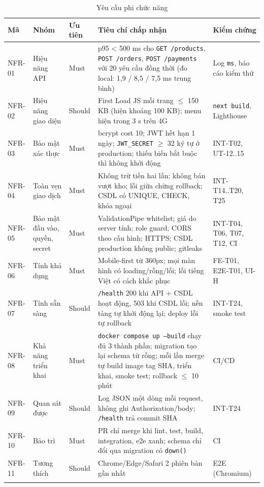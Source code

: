 \documentclass[a4paper]{article}
\newcommand{\st}[1]{\texttt{#1}}
\begin{document}
{\begin{longtable}{|L{1.3cm}|L{2.4cm}|L{1.15cm}|L{7.2cm}|L{2.4cm}|}
\hline
\textbf{Mã} & \textbf{Nhóm} & \textbf{Ưu tiên} & \textbf{Tiêu chí chấp nhận} & \textbf{Kiểm chứng} \\ \hline
\endhead
NFR-01 & Hiệu năng API & Must & p95 < 500 ms cho \st{GET /products}, \st{POST /orders}, \st{POST /payments} với 20 yêu cầu đồng thời (đo local: 1,9 / 8,5 / 7,5 ms trung bình) & Log \st{ms}, báo cáo kiểm thử \\ \hline
NFR-02 & Hiệu năng giao diện & Should & First Load JS mỗi trang $\le$ 150 KB (hiện khoảng 100 KB); menu hiện trong 3 s trên 4G & \st{next build}, Lighthouse \\ \hline
NFR-03 & Bảo mật xác thực & Must & bcrypt cost 10; JWT hết hạn 1 ngày; \st{JWT\_SECRET} $\ge$ 32 ký tự ở production; thiếu biến bắt buộc thì không khởi động & INT-T02, UT-12..15 \\ \hline
NFR-04 & Toàn vẹn giao dịch & Must & Không trừ tiền hai lần; không bán vượt kho; lỗi giữa chừng rollback; CSDL có UNIQUE, CHECK, khóa ngoại & INT-T14..T20, T25 \\ \hline
NFR-05 & Bảo mật đầu vào, quyền, secret & Must & ValidationPipe whitelist; giá do server tính; role guard; CORS theo cấu hình; HTTPS; CSDL production không public; gitleaks & INT-T04, T06, T07, T12, CI \\ \hline
NFR-06 & Tính khả dụng & Must & Mobile-first từ 360px; mọi màn hình có loading/rỗng/lỗi; lỗi tiếng Việt có cách khắc phục & FE-T01, E2E-T01, UI-H \\ \hline
NFR-07 & Tính sẵn sàng & Should & \st{/health} 200 khi API + CSDL hoạt động, 503 khi CSDL lỗi; nền tảng tự khởi động lại; deploy lỗi tự rollback & INT-T24, smoke test \\ \hline
NFR-08 & Khả năng triển khai & Must & \st{docker compose up --build} chạy đủ 3 thành phần; migration tạo lại schema từ rỗng; mỗi lần merge tự build image tag SHA, triển khai, smoke test; rollback $\le$ 10 phút & CI/CD \\ \hline
NFR-09 & Quan sát được & Should & Log JSON một dòng mỗi request, không ghi Authorization/body; \st{/health} trả commit SHA & INT-T24 \\ \hline
NFR-10 & Bảo trì & Must & PR chỉ merge khi lint, test, build, integration, e2e xanh; schema chỉ đổi qua migration có \st{down()} & CI \\ \hline
NFR-11 & Tương thích & Should & Chrome/Edge/Safari 2 phiên bản gần nhất & E2E (Chromium) \\ \hline
\caption{Yêu cầu phi chức năng}
\end{longtable}
}
\end{document}
